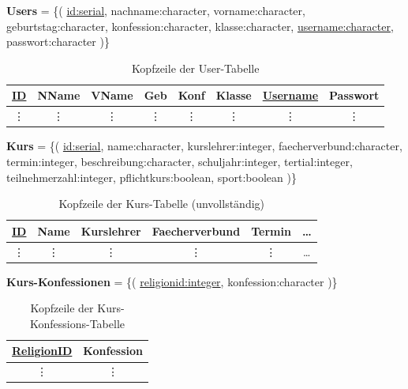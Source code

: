 \documentclass[12pt, twoside, a4paper, ngerman]{article}
\begin{document}
\textbf{Users} = \{( \underline{id:serial}, nachname:character, vorname:character, geburtstag:character, konfession:character, klasse:character, \underline{username:character}, passwort:character )\}

\begin{table}[H]
\begin{center}
	\begin{tabular}{|c|c|c|c|c|c|c|c|}\hline
		\textbf{\underline{ID}} & \textbf{NName} & \textbf{VName} & \textbf{Geb} & \textbf{Konf} & \textbf{Klasse} & \textbf{\underline{Username}} & \textbf{Passwort} \\ \hline
		\vdots & \vdots & \vdots & \vdots & \vdots & \vdots & \vdots & \vdots \\
	\end{tabular}
	\caption{Kopfzeile der User-Tabelle}
\end{center}
\end{table}

\textbf{Kurs} = \{( \underline{id:serial}, name:character, kurslehrer:integer, faecherverbund:character, termin:integer, beschreibung:character, schuljahr:integer, tertial:integer, 
teilnehmerzahl:integer, pflichtkurs:boolean, sport:boolean )\}

\begin{table}[H]
\begin{center}
	\begin{tabular}{|c|c|c|c|c|c}\hline
		\textbf{\underline{ID}} & \textbf{Name} & \textbf{Kurslehrer} & \textbf{Faecherverbund} & \textbf{Termin} & \dots \\ \hline
		\vdots & \vdots & \vdots & \vdots & \vdots & \dots \\
	\end{tabular}
	\caption{Kopfzeile der Kurs-Tabelle  (unvollständig)}
\end{center}
\end{table}

\textbf{Kurs-Konfessionen} = \{( \underline{religionid:integer}, konfession:character )\} 
 
\begin{table}[H]
\begin{center}
	\begin{tabular}{|c|c|}\hline
		\textbf{\underline{ReligionID}} & \textbf{Konfession} \\ \hline
		\vdots & \vdots \\
	\end{tabular}
	\caption{Kopfzeile der Kurs-Konfessions-Tabelle}
\end{center}
\end{table}
\end{document}
